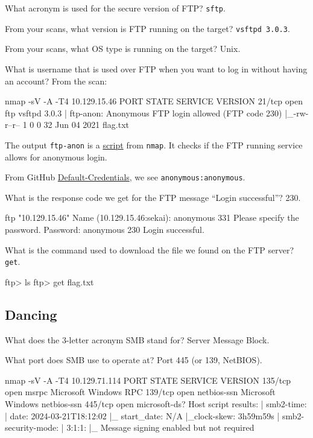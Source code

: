\documentclass[a4paper,12pt]{article}
\newcommand{\bashinline}[1]{\texttt{#1}}
\begin{document}
What acronym is used for the secure version of FTP? \bashinline{sftp}.

From your scans, what version is FTP running on the target? \bashinline{vsftpd 3.0.3}.

From your scans, what OS type is running on the target? Unix.

What is username that is used over FTP when you want to log in without having an account? From the scan:
\begin{bash}
nmap -sV -A -T4 10.129.15.46
PORT   STATE SERVICE VERSION
21/tcp open  ftp     vsftpd 3.0.3
| ftp-anon: Anonymous FTP login allowed (FTP code 230)
|_-rw-r--r--    1 0        0              32 Jun 04  2021 flag.txt
\end{bash}

The output \bashinline{ftp-anon} is a \href{https://nmap.org/nsedoc/scripts/ftp-anon.html}{script} from \bashinline{nmap}. It checks if the FTP running service allows for anonymous login.

From GitHub \href{https://github.com/danielmiessler/SecLists/blob/master/Passwords/Default-Credentials/ftp-betterdefaultpasslist.txt}{Default-Credentials}, we see \bashinline{anonymous:anonymous}.

What is the response code we get for the FTP message ``Login successful''? 230.
\begin{bash}
ftp "10.129.15.46"
Name (10.129.15.46:sekai): anonymous
331 Please specify the password.
Password: anonymous
230 Login successful.
\end{bash}

What is the command used to download the file we found on the FTP server? \bashinline{get}.
\begin{bash}
ftp> ls
ftp> get flag.txt
\end{bash}

\subsection{Dancing \faWindows}

What does the 3-letter acronym SMB stand for? Server Message Block.

What port does SMB use to operate at? Port 445 (or 139, NetBIOS).
\begin{bash}
nmap -sV -A -T4 10.129.71.114
PORT    STATE SERVICE       VERSION
135/tcp open  msrpc         Microsoft Windows RPC
139/tcp open  netbios-ssn   Microsoft Windows netbios-ssn
445/tcp open  microsoft-ds?
Host script results:
| smb2-time:
|   date: 2024-03-21T18:12:02
|_  start_date: N/A
|_clock-skew: 3h59m59s
| smb2-security-mode:
|   3:1:1:
|_    Message signing enabled but not required
\end{bash}
\end{document}
